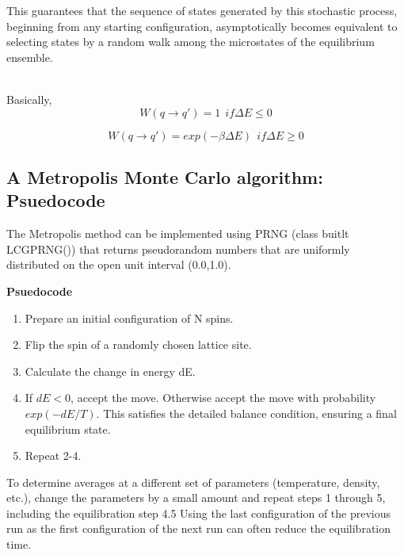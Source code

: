 \documentclass[5p,authoryear]{elsarticle}
\begin{document}
This guarantees that the sequence of states generated by this stochastic process, beginning from any starting configuration, asymptotically becomes equivalent to selecting states by a random walk among the microstates of the equilibrium ensemble.

\\
Basically,
\begin{equation}
  W(q \rightarrow q') = 1 \ \ if \Delta E \le 0
\end{equation}

\begin{equation}
  W(q \rightarrow q') = exp(-\beta \Delta E) \ \ if \Delta E \ge 0
\end{equation}

\subsection{A Metropolis Monte Carlo algorithm: Psuedocode}
The Metropolis method can be implemented using PRNG (class buitlt LCGPRNG()) that returns pseudorandom numbers that are uniformly distributed on the open unit interval (0.0,1.0).

\begin{tcolorbox}[width=4in,
                  interior hidden,
                  boxsep=0pt,
                  left=0pt,
                  right=0pt,
                  top=2pt,
                  ]%
  \textbf{Psuedocode}
  \begin{enumerate}
    \item Prepare an initial configuration of N spins.
    \item Flip the spin of a randomly chosen lattice site.
    \item Calculate the change in energy dE.
    \item If $dE < 0$, accept the move. Otherwise accept the move with probability $exp(-dE/T)$. This   satisfies the detailed balance condition, ensuring a final equilibrium state.
    \item Repeat 2-4.
  \end{enumerate}
\end{tcolorbox}

To determine averages at a different set of parameters (temperature, density, etc.), change
the parameters by a small amount and repeat steps 1 through 5, including the equilibration
step 4.5 Using the last configuration of the previous run as the first configuration of the next
run can often reduce the equilibration time.
\end{document}
